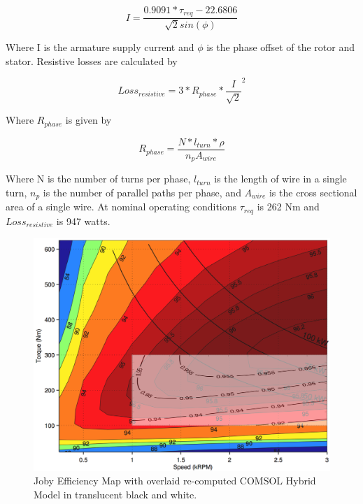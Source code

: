 \documentclass[]{aiaa-tc}%
\begin{document}
\begin{equation}
I = \frac{0.9091*\tau_{req}-22.6806}{\sqrt{2}sin(\phi)}
\label{eq:CurrentLoss}
\end{equation}

Where I is the armature supply current and $\phi$ is the phase offset of the rotor and stator.
Resistive losses are calculated by 

\begin{equation}
Loss_{resistive} =3*R_{phase}*\frac{I}{\sqrt{2}}^{2}
\label{eq:ResLoss}
\end{equation}

Where $R_{phase}$ is given by 

\begin{equation}
R_{phase} =\frac{N*l_{turn}*\rho}{n_{p}A_{wire}}
\label{eq:Rphase}
\end{equation}

Where N is the number of turns per phase, $l_{turn}$ is the length of wire in a single turn, $n_{p}$ is the number of parallel paths per phase, and $A_{wire}$ is the cross sectional area of a single wire.
At nominal operating conditions $\tau_{req}$ is 262 Nm and $Loss_{resistive}$ is 947 watts. 

\begin{figure}[!htb]%
	\centering
    \includegraphics[width=1.0\textwidth]{figures/map_compare.png}
	\caption{Joby Efficiency Map with overlaid re-computed COMSOL Hybrid Model in translucent black and white.}
	\label{fig:map}
\end{figure}
\end{document}
